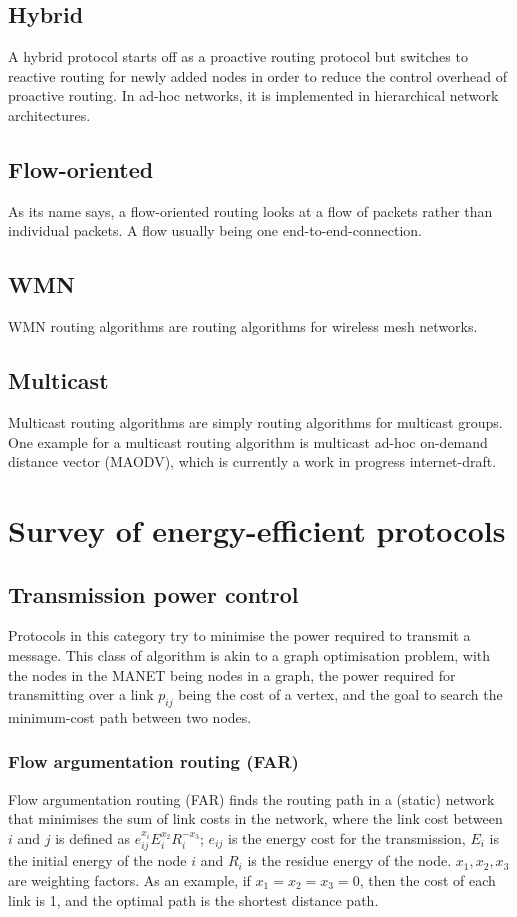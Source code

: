 \documentclass[conference]{IEEEtran}
\begin{document}
\subsection{Hybrid}
A hybrid protocol starts off as a proactive routing protocol but switches
to reactive routing for newly added nodes in order to reduce the control
overhead of proactive routing. In ad-hoc networks, it is implemented in
hierarchical network architectures.

\subsection{Flow-oriented}
As its name says, a flow-oriented routing looks at a flow of packets rather
than individual packets. A flow usually being one end-to-end-connection.

\subsection{WMN}
WMN routing algorithms are routing algorithms for wireless mesh networks.

\subsection{Multicast}
Multicast routing algorithms are simply routing algorithms for multicast
groups.
One example for a multicast routing algorithm is multicast ad-hoc on-demand
distance vector (MAODV)\cite{manet-maodv-00}, which is currently a work
in progress internet-draft.

\section{Survey of energy-efficient protocols}
\subsection{Transmission power control}
Protocols in this category try to minimise the power required to transmit
a message. This class of algorithm is akin to a graph optimisation problem,
with the nodes in the MANET being nodes in a graph, the power required for
transmitting over a link $p_{ij}$ being the cost of a vertex, and the goal
to search the minimum-cost path between two nodes.

\subsubsection{Flow argumentation routing (FAR)}
Flow argumentation routing (FAR)\cite{chang2000energy} finds the routing
path in a (static) network that minimises the sum of link costs in the network,
where the link cost between $i$ and $j$ is defined as \( e_{ij}^{x_{i}}E_{i}^{x_{2}}R_{i}^{-x_{3}}\);
\(e_{ij}\) is the energy cost for the transmission, $E_{i}$ is the initial energy
of the node $i$ and $R_{i}$ is the residue energy of the node. \(x_{1}, x_{2}, x_{3}\)
are weighting factors. As an example, if $x_{1}=x_{2}=x_{3}=0$, then the cost
of each link is 1, and the optimal path is the shortest distance path.
\end{document}
